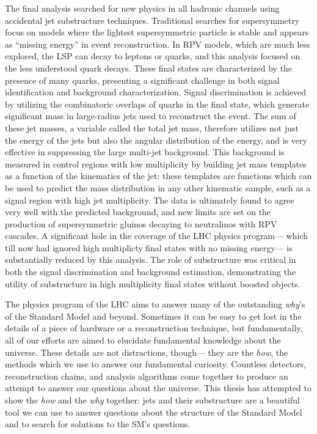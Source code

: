 The final analysis searched for new physics in all hadronic channels using accidental jet substructure techniques. Traditional searches for supersymmetry focus on models where the lightest supersymmetric particle is stable and appears as ``missing energy'' in event reconstruction. In RPV models, which are much less explored, the LSP can decay to leptons or quarks, and this analysis focused on the less understood quark decays. These final states are characterized by the presence of many quarks, presenting a significant challenge in both signal identification and background characterization. Signal discrimination is achieved by utilizing the combinatoric overlaps of quarks in the final state, which generate significant mass in large-radius jets used to reconstruct the event. The sum of these jet masses, a variable called the total jet mass, therefore utilizes not just the energy of the jets but also the angular distribution of the energy, and is very effective in suppressing the large multi-jet background. This background is measured in control regions with low multiplicity by building jet mass templates as a function of the kinematics of the jet: these templates are functions which can be used to predict the mass distribution in any other kinematic sample, such as a signal region with high jet multiplicity. The data is ultimately found to agree very well with the predicted background, and new limits are set on the production of supersymmetric gluinos decaying to neutralinos with RPV cascades. A significant hole in the coverage of the LHC physics program--- which till now had ignored high multiplicty final states with no missing energy--- is substantially reduced by this analysis. The role of substructure was critical in both the signal discrimination and background estimation, demonstrating the utility of substructure in high multiplicity final states without boosted objects.


The physics program of the LHC aims to answer many of the outstanding \textit{why}'s of the Standard Model and beyond. Sometimes it can be easy to get lost in the details of a piece of hardware or a reconstruction technique, but fundamentally, all of our efforts are aimed to elucidate fundamental knowledge about the universe. These details are not distractions, though--- they are the \textit{how}, the methods which we use to answer our fundamental curiosity. Countless detectors, reconstruction chains, and analysis algorithms come together to produce an attempt to answer our questions about the universe. This thesis has attempted to show the \textit{how} and the \textit{why} together: jets and their substructure are a beautiful tool we can use to answer questions about the structure of the Standard Model and to search for solutions to the SM's questions. 



